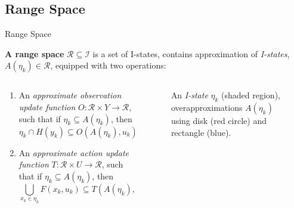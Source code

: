 \subsection[Range Space]{Range Space}
\begin{frame}{Range Space}
  \begin{definition}{\textbf{A range space}}
    $\mathcal{R} \subseteq \mathcal{I}$ is a set of I-states, contains
    approximation of \emph{I-states}, $A(\eta_k) \in \mathcal{R}$, equipped with
    two operations:
  \end{definition}
  \begin{columns}
    \begin{column}{.5\textwidth}
      \begin{enumerate}
      \item An \emph{approximate observation update function} $O: \mathcal{R} \times
        Y \to \mathcal{R}$, such that if $\eta_k \subseteq A(\eta_k)$, then
        $$\eta_k \cap H(y_k) \subseteq O(A(\eta_k), u_k)$$
      \item An \emph{approximate action update function} $T: \mathcal{R} \times U \to
        \mathcal{R}$, such that if $\eta_k \subseteq A(\eta_k)$, then
        $$\bigcup_{x_k \in \eta_k} F(x_k, u_k) \subseteq T(A(\eta_k), u_k)$$
      \end{enumerate}
    \end{column}
    \begin{column}{.4\textwidth}
    \begin{figure}
    \caption{\scriptsize{An \emph{I-state} $\eta_k$ (shaded region),
        overapproximations $A(\eta_k)$ using disk (red circle) and rectangle
        (blue). }}
    \end{figure}
  \end{column}
\end{columns}
\end{frame}

